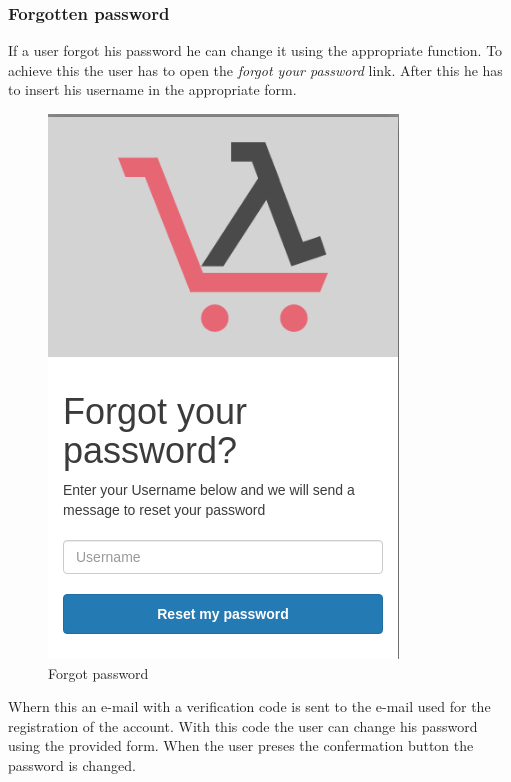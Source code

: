 \subsubsection{Forgotten password}
If a user forgot his password he can change it using the appropriate function. To achieve this the user has to open the \textit{forgot your password} link. After this he has to insert his username in the appropriate form.
\begin{figure}[!ht]
    \caption{Forgot password}
    \vspace{10px}
    \includegraphics[scale=0.3]{../../../../Images/userManual/forgotPWD.png}
    \centering
\end{figure}
Whern this an e-mail with a verification code is sent to the e-mail used for the registration of the account. With this code the user can change his password using the provided form. When the user preses the confermation button the password is changed.
